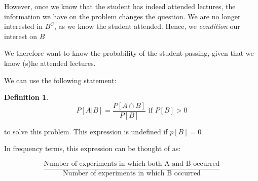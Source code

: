 \documentclass[12pt]{extbook}
\newtheorem{df}{Definition}[section]
\begin{document}

However, once we know that the student has indeed attended lectures, the information we have on the problem changes the question.   We are no longer interested in $B^C$, as we know the student attended.   Hence, we {\color{green}\emph{condition}} our interest on $B$


We therefore want to know the probability of the student passing, given that we know (s)he attended lectures.



We can use the following statement:

\begin{df}
\begin{displaymath}
P[A|B] = \frac{P[A \cap B] }{P[B]} \mbox{ if } P[B] > 0
\end{displaymath}
\end{df}
to solve this problem.   This expression is undefined if $p[B] = 0$

 

In frequency terms, this expression can be thought of as:

\begin{displaymath}
\frac{\mbox{Number of experiments in which both A and B occurred}}{\mbox{Number of experiments in which B occurred}}
\end{displaymath}



 


 




\end{document}
